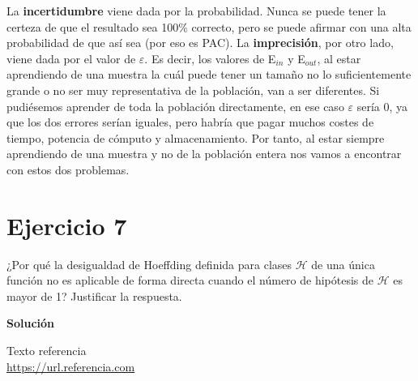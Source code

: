 \documentclass[11pt,a4paper]{article}
\newcommand{\answer}{\noindent\textbf{Solución}}
\newcommand{\ein}{E$_{in}$}
\newcommand{\eout}{E$_{out}$}
\newcommand{\addtoc}[1]{\addcontentsline{toc}{section}{#1}}
\begin{document}
La \textbf{incertidumbre} viene dada por la probabilidad. Nunca se puede tener la certeza de que el resultado sea 100\%
correcto, pero se puede afirmar con una alta probabilidad de que así sea (por eso es PAC).
La \textbf{imprecisión}, por otro lado, viene dada por el valor de $\varepsilon$. Es decir, los valores de \ein{} y \eout{},
al estar aprendiendo de una muestra la cuál puede tener un tamaño no lo suficientemente grande o no ser muy representativa
de la población, van a ser diferentes.
Si pudiésemos aprender de toda la población directamente, en ese caso $\varepsilon$ sería 0, ya que los dos errores serían
iguales, pero habría que pagar muchos costes de tiempo, potencia de cómputo y almacenamiento. Por tanto, al estar siempre
aprendiendo de una muestra y no de la población entera nos vamos a encontrar con estos dos problemas.

\section*{Ejercicio 7}
\addtoc{Ejercicio 7}

\noindent ¿Por qué la desigualdad de Hoeffding definida para clases $\mathcal{H}$ de una única función no es aplicable de
forma directa cuando el número de hipótesis de $\mathcal{H}$ es mayor de 1? Justificar la respuesta.

\answer



\newpage

\begin{thebibliography}{5}

Texto referencia
\\\url{https://url.referencia.com}

\end{thebibliography}
\end{document}
